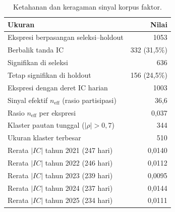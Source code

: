 \begin{table}[htbp]
\centering
\caption{Ketahanan dan keragaman sinyal korpus faktor.}
\label{tab:stabilitas}
\small
\begin{tabular}{lr}
\hline
Ukuran & Nilai \\
\hline
Ekspresi berpasangan seleksi--holdout & 1053 \\
Berbalik tanda IC & 332 (31,5\%) \\
Signifikan di seleksi & 636 \\
Tetap signifikan di holdout & 156 (24,5\%) \\
\hline
Ekspresi dengan deret IC harian & 1003 \\
Sinyal efektif $n_{\text{eff}}$ (rasio partisipasi) & 36,6 \\
Rasio $n_{\text{eff}}$ per ekspresi & 0,037 \\
Klaster pautan tunggal ($|\rho|>0,7$) & 344 \\
Ukuran klaster terbesar & 510 \\
\hline
Rerata $|IC|$ tahun 2021 (247 hari) & 0,0140 \\
Rerata $|IC|$ tahun 2022 (246 hari) & 0,0112 \\
Rerata $|IC|$ tahun 2023 (239 hari) & 0,0095 \\
Rerata $|IC|$ tahun 2024 (237 hari) & 0,0144 \\
Rerata $|IC|$ tahun 2025 (234 hari) & 0,0111 \\
\hline
\end{tabular}
\end{table}
